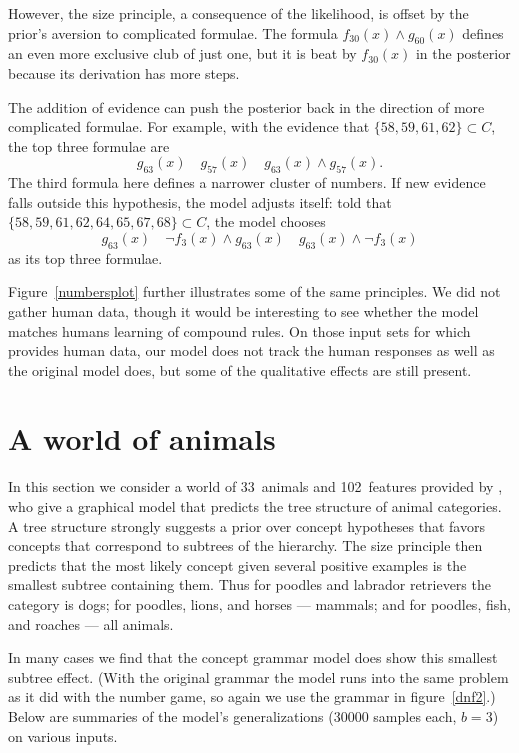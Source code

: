 \documentclass[apacite,jou]{apa6}
\begin{document}
However, the size principle, a consequence of the likelihood,
 is offset by the prior's aversion to complicated formulae.
The formula $f_{30}(x)\wedge g_{60}(x)$ defines an even more
exclusive club of just one, but it is beat by $f_{30}(x)$ in
the posterior because its derivation has more steps.

The addition of evidence can push the posterior back in the direction
of more complicated formulae. For example, with the evidence that
$\{58, 59, 61, 62\} \subset C$, the
top three formulae are
\[ g_{63}(x)\quad g_{57}(x) \quad g_{63}(x)\wedge g_{57}(x). \]
The third formula here defines a narrower cluster of numbers.
If new evidence falls outside this hypothesis, the model adjusts
itself: told that $\{58, 59, 61, 62, 64, 65, 67, 68\} \subset C$,
the model chooses
\[ g_{63}(x)\quad \neg f_3(x)\wedge g_{63}(x) 
    \quad g_{63}(x)\wedge\neg f_3(x) \]
as its top three formulae.

Figure~\ref{numbersplot} further illustrates some of the same principles.
We did not gather human data, though it would be interesting to
see whether the model matches humans learning of compound rules.
On those input sets for which \citet{numbergame} provides human data,
our model does not track the human responses as well as the original model
does, but some of the qualitative effects are still present.


\section{A world of animals}

In this section we consider a world of 33~animals and 102~features
provided by \citet{kemp}, who give a graphical model that predicts
the tree structure of animal categories. A tree structure strongly
suggests a prior over concept hypotheses that favors concepts that
correspond to subtrees of the hierarchy. The size principle then
predicts that the most likely concept given several positive examples
is the smallest subtree containing them. Thus for poodles and
labrador retrievers the category is dogs; for
poodles, lions, and horses --- mammals; and for poodles, fish,
and roaches --- all animals.

In many cases we find that the concept grammar model does show
this smallest subtree effect.
(With the original grammar the model runs into the same problem
as it did with the number game, so again we use the grammar in 
figure~\ref{dnf2}.) Below are summaries
of the  model's generalizations (30000 samples each, $b=3$) 
on various inputs.
\end{document}
